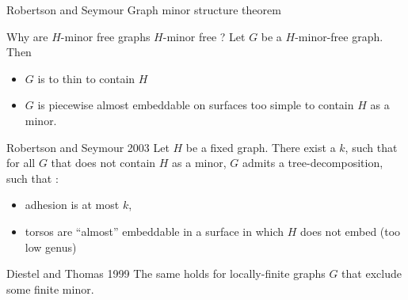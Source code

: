 \documentclass[11pt,dvipsnames,presentation,aspectratio=169]{beamer}
\begin{document}
\begin{frame}{Robertson and Seymour Graph minor structure theorem}
  \begin{alertblock}{Why are $H$-minor free graphs $H$-minor free ?}
    Let $G$ be a $H$-minor-free graph. Then 
    \begin{itemize}
    \item $G$ is to thin to contain $H$
    \item $G$ is piecewise almost embeddable on surfaces too simple to contain
      $H$ as a minor.
    \end{itemize}
  \end{alertblock}

  \pause
  \begin{block}{Robertson and Seymour 2003}
    Let $H$ be a fixed graph. There exist a $k$, such that for all $G$ that does
    not contain $H$ as a minor, $G$ admits a tree-decomposition, such that :
    \begin{itemize}
    \item adhesion is at most $k$,
    \item torsos are ``almost'' embeddable in a surface in which $H$ does not
      embed (too low genus)
    \end{itemize}
  \end{block}

  \begin{block}{Diestel and Thomas 1999}
    The same holds for locally-finite graphs $G$ that exclude some finite minor.
  \end{block}
\end{frame}
\end{document}
